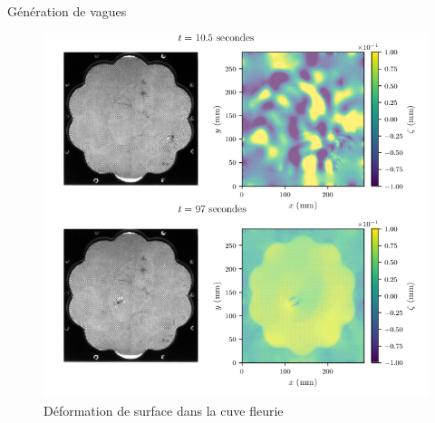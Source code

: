 \documentclass[aspectratio=169,10pt]{beamer}
\begin{document}
  \begin{frame}{Génération de vagues}
    \begin{figure}[!ht]
        \centering
        \includegraphics[scale=.5]{./figures/Generation_de_vagues.png}
        \caption{Déformation de surface dans la cuve fleurie}
  \end{figure}
\end{frame}
\end{document}
